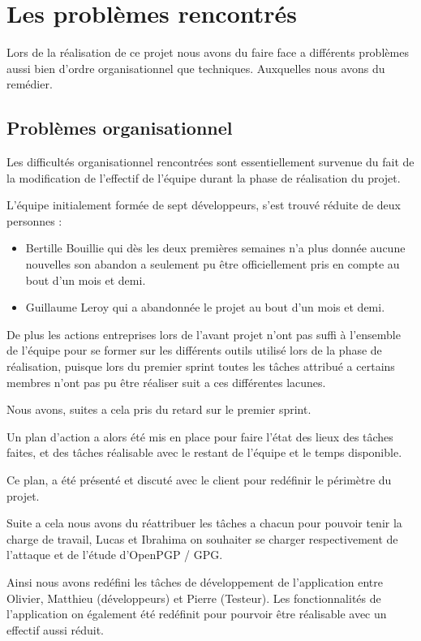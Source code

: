 \documentclass{../res/univ-projet}
\begin{document}
\section{Les problèmes rencontrés}

  Lors de la réalisation de ce projet nous avons du faire face a
  différents problèmes aussi bien d'ordre organisationnel que techniques.
  Auxquelles nous avons du remédier.

  \subsection{Problèmes organisationnel}

    Les difficultés organisationnel rencontrées sont essentiellement
    survenue du fait de la modification de l'effectif de l'équipe durant la
    phase de réalisation du projet. 

    L'équipe initialement formée de sept développeurs,
    s'est trouvé réduite de deux personnes :
    \begin{itemize}
      \item Bertille Bouillie qui dès les deux premières semaines n'a plus donnée
      aucune nouvelles son abandon a seulement pu être officiellement pris en compte au bout d'un mois et demi.
      \item Guillaume Leroy qui a abandonnée le projet au bout d'un mois et demi.
    \end{itemize}
    De plus les actions entreprises lors de l'avant projet n'ont pas suffi à l'ensemble de l'équipe 
    pour se former sur les différents outils utilisé lors de la phase de réalisation,
    puisque lors du premier sprint toutes les tâches attribué a certains membres n'ont pas pu être
    réaliser suit a ces différentes lacunes.

    Nous avons, suites a cela pris du retard sur le premier sprint.

    Un plan d'action a alors été mis en place pour faire l'état des lieux des tâches
    faites, et des tâches réalisable avec le restant de l'équipe et le temps disponible.

    Ce plan, a été présenté et discuté avec le client pour redéfinir le périmètre du projet.

    Suite a cela nous avons du réattribuer les tâches a chacun pour pouvoir tenir la charge de travail,
    Lucas et Ibrahima on souhaiter se charger respectivement de l'attaque et de l'étude d'OpenPGP / GPG.

    Ainsi nous avons redéfini les tâches de développement de l'application
    entre Olivier, Matthieu (développeurs) et Pierre (Testeur).
    Les fonctionnalités de l'application on également été redéfinit pour pourvoir être réalisable avec un effectif
    aussi réduit.
\end{document}

